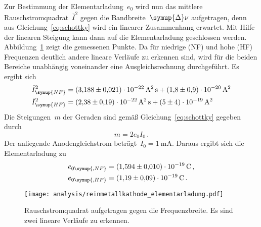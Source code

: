 Zur Bestimmung der Elementarladung~$e_0$ wird nun das mittlere
Rauschstromquadrat~$\bar{I}^2$ gegen die Bandbreite~$\symup{\Delta}\nu$
aufgetragen, denn aus Gleichung~\eqref{eq:schottky} wird ein linearer
Zusammenhang erwartet. Mit Hilfe der linearen Steigung kann dann auf die
Elementarladung geschlossen werden.
Abbildung~\ref{fig:reinmetallkathode_elementarladung} zeigt die gemessenen
Punkte. Da für niedrige (NF) und hohe (HF) Frequenzen deutlich andere lineare
Verläufe zu erkennen sind, wird für die beiden Bereiche unabhängig voneinander
eine Ausgleichsrechnung durchgeführt. Es ergibt sich
%
\begin{align}
    \bar{I}^2_{\symup{NF}}&=\SI{3.188(21)e-22}{\ampere\squared\second}+\SI{1.8(9)e-20}{\ampere\squared} \\
    \bar{I}^2_{\symup{HF}}&=\SI{2.38(19)e-22}{\ampere\squared\second}+\SI{5(4)e-19}{\ampere\squared}
\end{align}
%
Die Steigungen~$m$ der Geraden sind gemäß Gleichung~\eqref{eq:schottky} gegeben
durch
%
\begin{equation}
  m=2e_0I_0 \, .
\end{equation}
%
Der anliegende Anodengleichstrom beträgt~$I_0=\SI{1}{\milli\ampere}$. Daraus
ergibt sich die Elementarladung zu
%
\begin{align}
  e_{0\symup{, NF}}&=\SI{1.594(10)e-19}{\coulomb}\, , \\
  e_{0\symup{, HF}}&=\SI{1.19(9)e-19}{\coulomb} \, .
\end{align}

\begin{figure}[htb]
  \centering
  \texttt{[image: analysis/reinmetallkathode\_elementarladung.pdf]}
  \caption{Rauschstromquadrat aufgetragen gegen die Frequenzbreite. Es sind zwei
  lineare Verläufe zu erkennen.}
  \label{fig:reinmetallkathode_elementarladung}
\end{figure}
